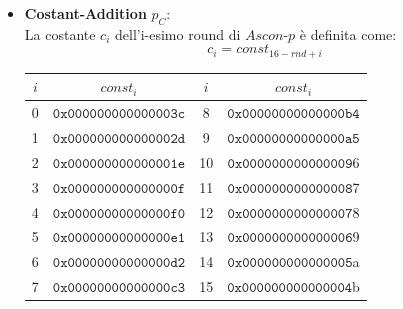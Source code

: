 \documentclass[target=bach,aauheader=,style=]{thud}
\begin{document}
			\begin{itemize}
				\item \textbf{Costant-Addition} $p_C$:\\
				La costante $c_i$ dell'i-esimo round di $Ascon$-$p$ è definita come:
				\[c_i = const_{16-rnd+i}\]
				\begin{center}
					\begin{tabular}{|c c || c c|}
						\hline
						$i$ & $const_i$ & $i$ & $const_i$ \\
						\hline
						0 & $\mathtt{0x000000000000003c}$ & 8 & $\mathtt{0x00000000000000b4}$\\
						1 & $\mathtt{0x000000000000002d}$ & 9 & $\mathtt{0x00000000000000a5}$\\
						2 & $\mathtt{0x000000000000001e}$ & 10 &$\mathtt{ 0x000000000000009}$6\\
						3 & $\mathtt{0x000000000000000f}$ & 11 &$\mathtt{ 0x000000000000008}$7\\
						4 & $\mathtt{0x00000000000000f0}$ & 12 &$\mathtt{ 0x000000000000007}$8\\
						5 & $\mathtt{0x00000000000000e1}$ & 13 &$\mathtt{ 0x000000000000006}$9\\
						6 & $\mathtt{0x00000000000000d2}$ & 14 &$\mathtt{ 0x000000000000005}$a\\
						7 & $\mathtt{0x00000000000000c3}$ & 15 &$\mathtt{ 0x000000000000004}$b\\
						\hline
					\end{tabular}
				\end{center}
				

\end{itemize}
\end{document}
